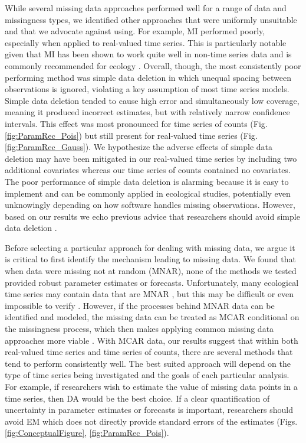 \documentclass[12pt,english]{article} %
\begin{document}
\begin{linenumbers}
\begin{spacing}{1.9}
\begin{flushleft}
\hspace{1em} While several missing data approaches performed well for a range of data and missingness types, we identified other approaches that were uniformly unsuitable and that we advocate against using. For example, MI performed poorly, especially when applied to real-valued time series. This is particularly notable given that MI has been shown to work quite well in non-time series data \citep{graham_missing_2009} and is commonly recommended for ecology \citep{nakagawa_missing_2008,ellington_using_2015}. Overall, though, the most consistently poor performing method was simple data deletion in which unequal spacing between observations is ignored, violating a key assumption of most time series models. Simple data deletion tended to cause high error and simultaneously low coverage, meaning it produced incorrect estimates, but with relatively narrow confidence intervals. This effect was most pronounced for time series of counts (Fig. \ref{fig:ParamRec_Pois}) but still present for real-valued time series (Fig. \ref{fig:ParamRec_Gauss}). We hypothesize the adverse effects of simple data deletion may have been mitigated in our real-valued time series by including two additional covariates whereas our time series of counts contained no covariates. The poor performance of simple data deletion is alarming because it is easy to implement and can be commonly applied in ecological studies, potentially even unknowingly depending on how software handles missing observations. However, based on our results we echo previous advice that researchers should avoid simple data deletion \citep{nakagawa_model_2011, Shoari2018_mnar,lopucki2022handling}.

\hspace{1em} Before selecting a particular approach for dealing with missing data, we argue it is critical to first identify the mechanism leading to missing data. We found that when data were missing not at random (MNAR), none of the methods we tested provided robust parameter estimates or forecasts. Unfortunately, many ecological time series may contain data that are MNAR \citep{bowler2025treating}, but this may be difficult or even impossible to verify \citep{nakagawa_missing_2015}. However, if the processes behind MNAR data can be identified and modeled, the missing data can be treated as MCAR conditional on the missingness process, which then makes applying common missing data approaches more viable \citep{newman_missing_2014, nakagawa_missing_2015}. With MCAR data, our results suggest that within both real-valued time series and time series of counts, there are several methods that tend to perform consistently well. The best suited approach will depend on the type of time series being investigated and the goals of each particular analysis. For example, if researchers wish to estimate the value of missing data points in a time series, then DA would be the best choice. If a clear quantification of uncertainty in parameter estimates or forecasts is important, researchers should avoid EM which does not directly provide standard errors of the estimates (Figs. \ref{fig:ConceptualFigure}, \ref{fig:ParamRec_Pois}).


\end{flushleft}
\end{spacing}
\end{linenumbers}
\end{document}

